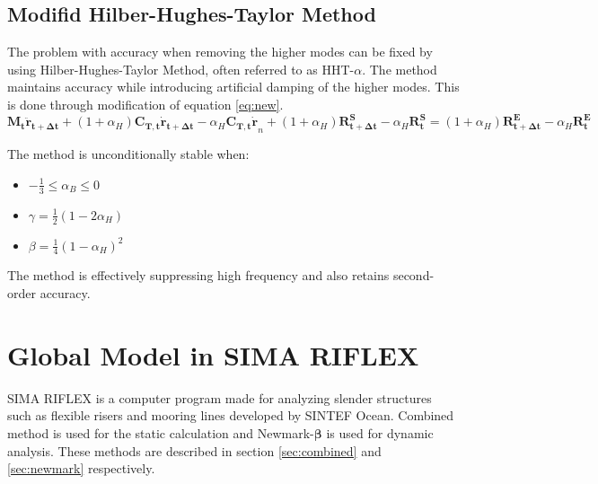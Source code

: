 \subsection{Modifid Hilber-Hughes-Taylor Method}
\label{sec:HHT}
The problem with accuracy when removing the higher modes can be fixed by using Hilber-Hughes-Taylor Method, often referred to as HHT-$\alpha$. The method maintains accuracy while introducing artificial damping of the higher modes. This is done through modification of equation \ref{eq:new}. 
\begin{equation}
   \boldsymbol{M_t \ddot{r}_{t+\Delta t}} + (1+\alpha_H)\boldsymbol{C_{T,t}\dot{r}_{t+\Delta t}}  -\alpha_H\boldsymbol{C_{T,t}\dot{r}}_{n}+ (1+\alpha_H)\boldsymbol{R_{t+\Delta t}^S}-\alpha_H\boldsymbol{R_{t}^S}=(1+\alpha_H) \boldsymbol{R_{t+\Delta t}^E}-\alpha_H\boldsymbol{R_{t}^E}
\end{equation}

The method is unconditionally stable when:
\begin{itemize}
    \item $-\frac{1}{3} \leq \alpha_B \leq 0 $
    \item  $\gamma = \frac{1}{2} (1-2 \alpha_H)$
    \item  $\beta = \frac{1}{4} (1- \alpha_H)^2$
\end{itemize}

\noindent The method is effectively suppressing high frequency and also retains second-order accuracy. \cite{Mathisen1990}

\section{Global Model in SIMA RIFLEX}
SIMA RIFLEX is a computer program made for analyzing slender structures such as flexible risers and mooring lines developed by SINTEF Ocean. Combined method is used for the static calculation and Newmark-$\boldsymbol{\beta}$ is used for dynamic analysis. These methods are described in section \ref{sec:combined} and \ref{sec:newmark} respectively. 


